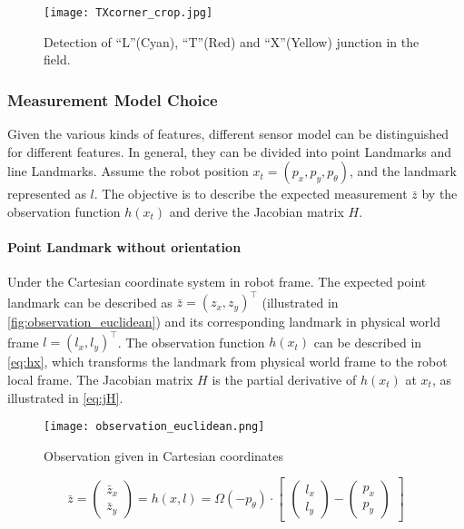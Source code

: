 \begin{figure}[h!]
  \centering
  \texttt{[image: TXcorner\_crop.jpg]}
  \caption{Detection of ``L''(Cyan), ``T''(Red) and ``X''(Yellow) junction in the field.}
  \label{fig:txcorner}
\end{figure}

\subsubsection{Measurement Model Choice}\label{subsub:sensorModelChoice}
Given the various kinds of features, different sensor model can be distinguished for different features. In general, they can be divided into point Landmarks and line Landmarks. Assume the robot position $x_t = (p_x, p_y, p_{\theta})$, and the landmark represented as $l$. The objective is to describe the expected measurement $\bar{z}$ by the observation function $h(x_t)$ and derive the Jacobian matrix $H$.
\paragraph{Point Landmark without orientation}\label{par:pointLandmark}
Under the Cartesian coordinate system in robot frame. The expected point landmark can be described as $\bar{z} = (z_x, z_y)^\top$ (illustrated in \autoref{fig:observation_euclidean}) and its corresponding landmark in physical world frame $l = (l_x, l_y)^\top$. The observation function $h(x_t)$ can be described in \autoref{eq:hx}, which transforms the landmark from physical world frame to the robot local frame. The Jacobian matrix $H$ is the partial derivative of $h(x_t)$ at $x_t$, as illustrated in \autoref{eq:jH}. 

\begin{figure}[h!]
  \centering
  \texttt{[image: observation\_euclidean.png]}
  \caption{Observation given in Cartesian coordinates \cite{Tasse2013}}
  \label{fig:observation_euclidean}
\end{figure}

\begin{equation}\label{eq:hx}
  \bar{z} = \begin{pmatrix}
\bar{z}_{x}\\ 
\bar{z}_{y}
\end{pmatrix}
= 
h(x, l)
=
\Omega(-p_{\theta})
\cdot
\begin{bmatrix}
 \begin{pmatrix}
l_{x}\\ 
l_{y}
\end{pmatrix}
-
\begin{pmatrix}
p_{x}\\ 
p_{y}
\end{pmatrix}
\end{bmatrix}
\end{equation}

